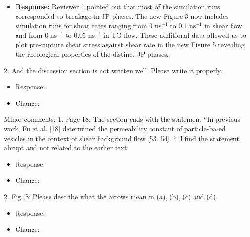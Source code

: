 \documentclass[11pt]{article}
\newcommand{\comment}[1]{{\color{blue} #1}}
\begin{document}
\begin{itemize}
  \item {\bf Response:}
  Reviewer 1 pointed out that most of the simulation runs
  corresponded to breakage in JP phases. The new Figure 3
  now includes simulation runs for shear rates ranging
  from $0$ ns$^{-1}$ to $0.1$ ns$^{-1}$ in shear flow
  and from $0$ ns$^{-1}$ to $0.05$ ns$^{-1}$ in TG flow.
  These additional data allowed us to plot pre-rupture
  shear stress against shear rate in the new Figure 5
  revealing the rheological properties of the distinct
  JP phases.    
\end{itemize}


\noindent
\comment{2. And the discussion section is not written well. Please write it
properly.}

\begin{itemize}
  \item Response:  
  
  \item Change: 
  
\end{itemize}


\noindent
\comment{Minor comments: 1. Page 18: The section ends with 
the statement “In previous work, Fu
et al. [18] determined the permeability constant of particle-based
vesicles in the context of shear background flow [53, 54]. “. I find
the statement abrupt and not related to the earlier text.}

\begin{itemize}
  \item Response: 
  
\item Change: 


\end{itemize}

\noindent
\comment{2. Fig. 8: Please describe what the arrows mean in (a), (b), (c) and
(d).}

\begin{itemize}
  \item Response: 
  
  \item Change:
  
\end{itemize}
\end{document}

